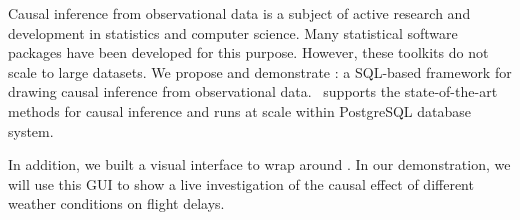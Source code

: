 Causal inference from observational data is a subject of active research and development in statistics and computer science. Many statistical software packages have been developed for this purpose.
However, these toolkits do not scale to large datasets.
We propose and demonstrate \GSQL: a SQL-based framework for drawing causal inference from observational data.
\GSQL\ supports the state-of-the-art methods for causal inference and runs at scale within PostgreSQL database system. 
In addition, we built a visual interface to wrap around \GSQL. In our demonstration, we will use this GUI to show a live investigation of the causal effect of different weather conditions on flight delays. 